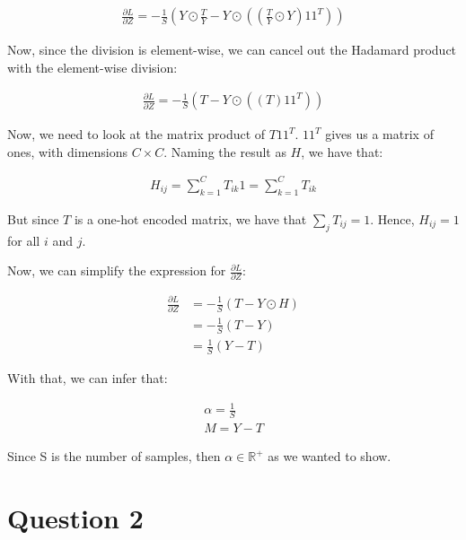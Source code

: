 \documentclass{article}
\begin{document}
\begin{align*}
    \frac{\partial L}{\partial Z} = - \frac{1}{S} \left( Y \odot \frac{T}{Y} - Y \odot \left( \left( \frac{T}{Y} \odot Y \right) 1 1^T \right) \right)
\end{align*}

Now, since the division is element-wise, we can cancel out the Hadamard product with the element-wise division:

\begin{align*}
    \frac{\partial L}{\partial Z} = - \frac{1}{S} \left( T - Y \odot \left( \left( T \right) 1 1^T \right) \right)
\end{align*}

Now, we need to look at the matrix product of $T 1 1^T$. $1 1^T$ gives us a matrix of ones, with dimensions $C \times C$.
Naming the result as $H$, we have that: 

\begin{align*}
    H_{ij} = \sum_{k=1}^{C} T_{ik} 1 = \sum_{k=1}^{C} T_{ik}
\end{align*}

But since $T$ is a one-hot encoded matrix, we have that $\sum_{j} T_{ij} = 1$. Hence, $H_{ij} = 1$ for all $i$ and $j$.

Now, we can simplify the expression for $\frac{\partial L}{\partial Z}$:

\begin{align*}
    \frac{\partial L}{\partial Z} &= - \frac{1}{S} \left( T - Y \odot H \right) \\
    &= - \frac{1}{S} \left( T - Y \right) \\
    &= \frac{1}{S} \left( Y - T \right)
\end{align*}

With that, we can infer that: 

\begin{align*}
    \alpha = \frac{1}{S} \\
    M = Y - T
\end{align*}

Since S is the number of samples, then $\alpha \in \mathbb{R}^{+}$ as we wanted to show.

\section*{Question 2}

\end{document}
